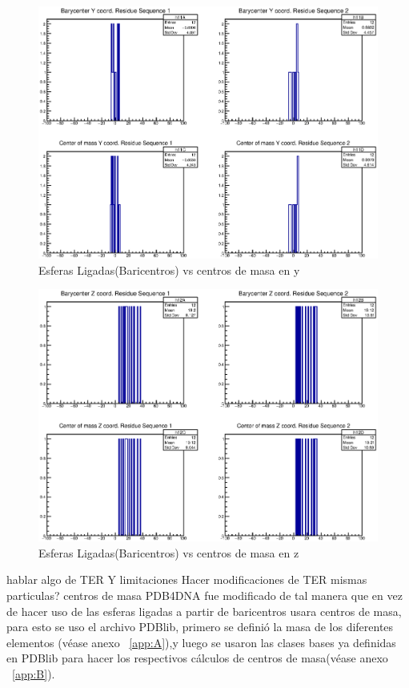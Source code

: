 \begin{figure}[htbp]
    \centering
    \includegraphics[width=1\linewidth]{./Figures/1fzy.eps}
    \caption[Esferas Ligadas(Baricentros) vs centros de masa en y]{Esferas Ligadas(Baricentros) vs centros de masa en y}
    \label{fig:cay}
\end{figure}

\begin{figure}[htbp]
    \centering
    \includegraphics[width=1\linewidth]{./Figures/1fzz.eps}
  \caption[Esferas Ligadas(Baricentros) vs centros de masa en z]{Esferas Ligadas(Baricentros) vs centros de masa en z}
    \label{fig:caz}
\end{figure}



hablar algo de TER Y limitaciones
Hacer modificaciones de TER
mismas particulas?
centros de masa
PDB4DNA fue modificado de tal manera que en vez de hacer uso de las esferas ligadas a partir de baricentros usara centros de masa, para esto se uso el archivo PDBlib, primero se definió la masa de los diferentes elementos (véase anexo ~\ref{app:A}),y luego se usaron las clases bases ya definidas en PDBlib para hacer los respectivos cálculos de centros de masa(véase anexo ~\ref{app:B}).\\
